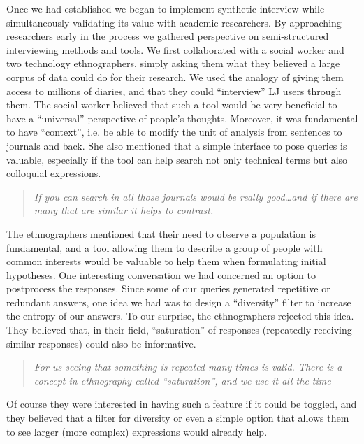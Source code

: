 \documentclass{sigchi}
\begin{document}
Once we had established we began to implement synthetic interview while simultaneously validating its value with academic researchers. By approaching researchers early in the process we gathered perspective on semi-structured interviewing methods and tools. We first collaborated with a social worker and two technology ethnographers, simply asking them what they believed a large corpus of data could do for their research. We used the analogy of giving them access to millions of diaries, and that they could ``interview'' LJ users through them. The social worker believed that such a tool would be very beneficial to have a ``universal'' perspective of people's thoughts. Moreover, it was fundamental to have ``context'', i.e. be able to modify the unit of analysis from sentences to journals and back. She also mentioned that a simple interface to pose queries is valuable, especially if the tool can help search not only technical terms but also colloquial expressions. 

\begin{quote}
{\em
If you can search in all those journals would be really good\dots and if there are many that are similar it helps to contrast. 
}\end{quote}

The ethnographers mentioned that their need to observe a population is fundamental, and a tool allowing them to describe a group of people with common interests would be valuable to help them when formulating initial hypotheses. One interesting conversation we had concerned an option to postprocess the responses. Since some of our queries generated repetitive or redundant answers, one idea we had was to design a ``diversity'' filter to increase the entropy of our answers. To our surprise, the ethnographers rejected this idea. They believed that, in their field, ``saturation'' of responses (repeatedly receiving similar responses) could also be informative.

\begin{quote}
{\em
For us seeing that something is repeated many times is valid. There is a concept in ethnography called ``saturation'', and we use it all the time
}\end{quote}

Of course they were interested in having such a feature if it could be toggled, and they believed that a filter for diversity or even a simple option that allows them to see larger (more complex) expressions would already help.
\end{document}
